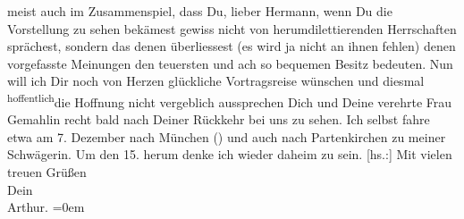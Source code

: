 \begin{ledgroupsized}[t]{13cm}
               meist auch im Zusammenspiel, dass Du, lieber Hermann, wenn Du die Vorstellung zu
               sehen bekämest gewiss nicht von herumdilettierenden Herrschaften sprächest, sondern
               das denen überliessest (es wird ja nicht an ihnen fehlen) denen vorgefasste Meinungen
               den teuersten und ach so bequemen Besitz bedeuten.\pend
           \pstart
           Nun will ich Dir noch von Herzen glückliche Vortragsreise wünschen und  diesmal \substVorne{}\textsuperscript{hoffentlich}{\allowbreak}\substDazwischen{}die Hoffnung\substHinten{} nicht vergeblich aussprechen Dich
               und Deine verehrte Frau Gemahlin recht bald nach Deiner Rückkehr bei uns zu sehen. Ich selbst fahre
               etwa am 7. Dezember nach München (\label{K_L01981_5v}\label{K_L01981_5h}) und
               auch nach Partenkirchen zu meiner Schwägerin. Um den 15. herum denke ich wieder daheim zu sein.\pend
           \pstart
           {[}hs.:{]} Mit vielen treuen Grüßen{\\[\baselineskip]}Dein{\\[\baselineskip]}\spacefill\mbox{Arthur.}\pend
           \leftskip=0em{}\endnumbering{}\end{ledgroupsized}  \newcommand{\dateiname}{L01981}\newcommand{\titel}{Arthur Schnitzler an Hermann Bahr, 17. 11. 1910}\newcommand{\editorInnen}{ Kurt Ifkovits,  Martin Anton Müller}
            \footnotesize
\begin{ledgroupsized}[t]{11.5cm}
\end{ledgroupsized}
         
      